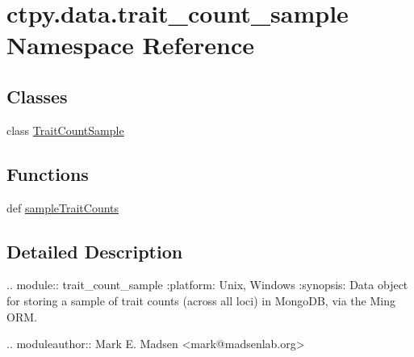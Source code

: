 \hypertarget{namespacectpy_1_1data_1_1trait__count__sample}{\section{ctpy.\-data.\-trait\-\_\-count\-\_\-sample Namespace Reference}
\label{namespacectpy_1_1data_1_1trait__count__sample}
}
\subsection*{Classes}
\begin{DoxyCompactItemize}
\item 
class \hyperlink{classctpy_1_1data_1_1trait__count__sample_1_1_trait_count_sample}{Trait\-Count\-Sample}
\end{DoxyCompactItemize}
\subsection*{Functions}
\begin{DoxyCompactItemize}
\item 
def \hyperlink{namespacectpy_1_1data_1_1trait__count__sample_a5c62d9dbc4aee45b24743ea44131c452}{sample\-Trait\-Counts}
\end{DoxyCompactItemize}


\subsection{Detailed Description}
\begin{DoxyVerb}.. module:: trait_count_sample
:platform: Unix, Windows
:synopsis: Data object for storing a sample of trait counts (across all loci) in MongoDB, via the Ming ORM.

.. moduleauthor:: Mark E. Madsen <mark@madsenlab.org>\end{DoxyVerb}
 


